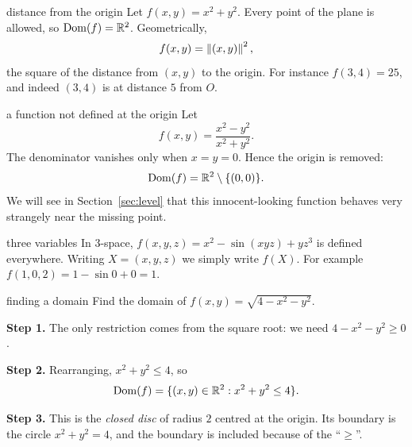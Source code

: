 \begin{example}{distance from the origin}
Let $f(x,y)=x^2+y^2$. Every point of the plane is allowed, so $\operatorname{Dom}(f)=\mathbb{R}^2$.
Geometrically,
\[ f(x,y)=\left\lVert (x,y)\right\rVert^2, \]
the square of the distance from $(x,y)$ to the origin. For instance $f(3,4)=25$, and
indeed $(3,4)$ is at distance $5$ from $O$.
\end{example}

\begin{example}{a function not defined at the origin}
Let
\[ f(x,y)=\frac{x^2-y^2}{x^2+y^2}. \]
The denominator vanishes only when $x=y=0$. Hence the origin is removed:
\[ \operatorname{Dom}(f)=\mathbb{R}^2\setminus\{(0,0)\}. \]
We will see in Section~\ref{sec:level} that this innocent-looking function behaves
very strangely near the missing point.
\end{example}

\begin{example}{three variables}
In $3$-space, $f(x,y,z)=x^2-\sin(xyz)+yz^3$ is defined everywhere. Writing
$X=(x,y,z)$ we simply write $f(X)$. For example
$f(1,0,2)=1-\sin 0+0=1$.
\end{example}

\begin{example}{finding a domain}
Find the domain of $f(x,y)=\sqrt{4-x^2-y^2}$.

\textbf{Step 1.} The only restriction comes from the square root: we need
$4-x^2-y^2\ge 0$.

\textbf{Step 2.} Rearranging, $x^2+y^2\le 4$, so
\[ \operatorname{Dom}(f)=\{(x,y)\in\mathbb{R}^2 : x^2+y^2\le 4\}. \]

\textbf{Step 3.} This is the \emph{closed disc} of radius $2$ centred at the origin. Its
boundary is the circle $x^2+y^2=4$, and the boundary is included because of the
``$\ge$''.

\begin{center}
\end{center}
\end{example}


